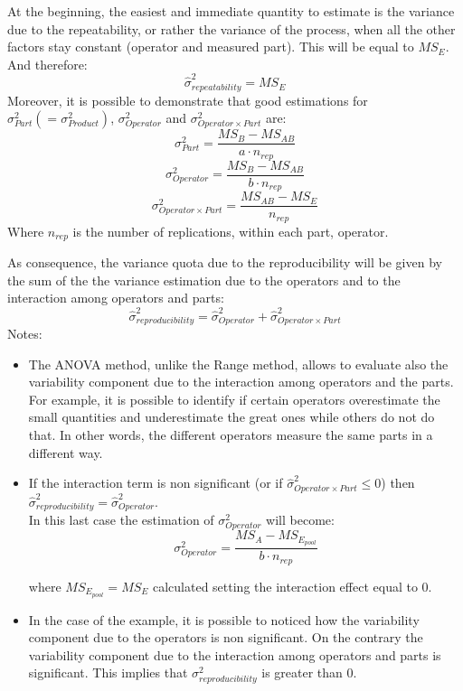 \begin{frame}
\begin{small}At the beginning, the easiest and immediate quantity to estimate is the variance due to the repeatability, or rather the variance of the process, when all the other factors stay constant (operator and measured part). This will be equal to $MS_{E}$. And therefore:
$$\hat{\sigma}^{2}_{repeatability}=MS_E$$
Moreover, it is possible to demonstrate that good estimations for $\sigma^2_{Part}(=\sigma^2_{Product})$, $\sigma^2_{Operator}$ and $\sigma^2_{Operator\times Part}$ are:
$$\sigma^2_{Part}=\frac{MS_B-MS_{AB}}{a\cdot n_{rep}}$$
$$\sigma^2_{Operator}=\frac{MS_B-MS_{AB}}{b\cdot n_{rep}}$$
$$\sigma^2_{Operator \times Part}=\frac{MS_{AB}-MS_{E}}{n_{rep}}$$
Where $n_{rep}$ is the number of replications, within each part, operator.                                                                               \end{small}
\end{frame}

\begin{frame}
\vspace*{.25cm}
As consequence, the variance quota due to the reproducibility will be given by the sum of the the variance estimation due to the operators and to the interaction among operators and parts:
$$\hat{\sigma}^{2}_{reproducibility}=\hat{\sigma}^{2}_{Operator}+\hat{\sigma}^{2}_{Operator \times Part}$$
Notes:\\
\begin{itemize}
 \item The ANOVA method, unlike the Range method, allows to evaluate also the variability component due to the interaction among operators and the parts. For example, it is possible to identify if certain operators overestimate the small quantities and underestimate the great ones while others do not do that. In other words, the different operators measure the same parts in a different way.
\end{itemize}
\end{frame}

\begin{frame}
\vspace*{.25cm}
\begin{itemize}
 \item If the interaction term is non significant (or if $\hat{\sigma}^{2}_{Operator \times Part}\leq 0$) then $\hat{\sigma}^{2}_{reproducibility}=\hat{\sigma}^{2}_{Operator}$.\\
 In this last case the estimation of ${\sigma}^{2}_{Operator}$ will become:
 $$\sigma^2_{Operator}=\frac{MS_A-MS_{E_{pool}}}{b\cdot n_{rep}}$$

 where $MS_{E_{pool}} = MS_{E}$ calculated setting the interaction effect equal to 0. 
 \item In the case of the example, it is possible to noticed how the variability component due to the operators is non significant. On the contrary the variability component due to the interaction among operators and parts is significant. This implies that ${\sigma}^{2}_{reproducibility}$ is greater than 0.
\end{itemize}
\end{frame}

